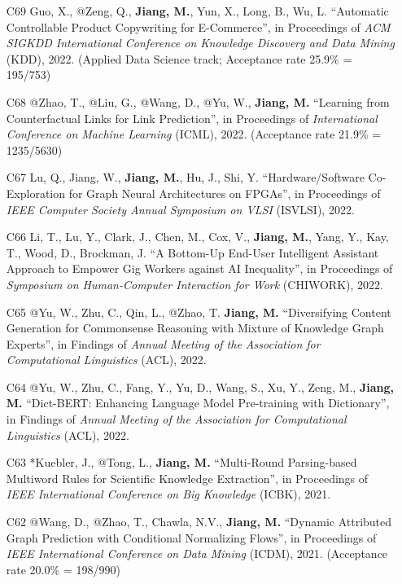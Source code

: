 \documentclass[10pt]{article}
\newenvironment{myindentpar}[1]%
{\begin{list}{}%
         {\setlength{\leftmargin}{#1}}%
         \item[]%
}
{\end{list}}
\newcounter{list}
\begin{document}
\begin{myindentpar}{0.00cm}
\begin{enumerate}[leftmargin=.5cm]
\item[C69] Guo, X., @Zeng, Q., \textbf{Jiang, M.}, Yun, X., Long, B., Wu, L. ``Automatic Controllable Product Copywriting for E-Commerce'', in Proceedings of \textit{ACM SIGKDD International Conference on Knowledge Discovery and Data Mining} (KDD), 2022. (Applied Data Science track; Acceptance rate 25.9\% = 195/753)

\item[C68] @Zhao, T., @Liu, G., @Wang, D., @Yu, W., \textbf{Jiang, M.} ``Learning from Counterfactual Links for Link Prediction'', in Proceedings of \textit{International Conference on Machine Learning} (ICML), 2022. (Acceptance rate 21.9\% = 1235/5630)

\item[C67] Lu, Q., Jiang, W., \textbf{Jiang, M.}, Hu, J., Shi, Y. ``Hardware/Software Co-Exploration for Graph Neural Architectures on FPGAs'', in Proceedings of \textit{IEEE Computer Society Annual Symposium on VLSI} (ISVLSI), 2022.

\item[C66] Li, T., Lu, Y., Clark, J., Chen, M., Cox, V., \textbf{Jiang, M.}, Yang, Y., Kay, T., Wood, D., Brockman, J. ``A Bottom-Up End-User Intelligent Assistant Approach to Empower Gig Workers against AI Inequality'', in Proceedings of \textit{Symposium on Human-Computer Interaction for Work} (CHIWORK), 2022.
		
\item[C65] @Yu, W., Zhu, C., Qin, L., @Zhao, T. \textbf{Jiang, M.} ``Diversifying Content Generation for Commonsense Reasoning with Mixture of Knowledge Graph Experts'', in Findings of \textit{Annual Meeting of the Association for Computational Linguistics} (ACL), 2022.

\item[C64] @Yu, W., Zhu, C., Fang, Y., Yu, D., Wang, S., Xu, Y., Zeng, M., \textbf{Jiang, M.} ``Dict-BERT: Enhancing Language Model Pre-training with Dictionary'', in Findings of \textit{Annual Meeting of the Association for Computational Linguistics} (ACL), 2022.

\item[C63] *Kuebler, J., @Tong, L., \textbf{Jiang, M.} ``Multi-Round Parsing-based Multiword Rules for Scientific Knowledge Extraction'', in Proceedings of \textit{IEEE International Conference on Big Knowledge} (ICBK), 2021.
		
\item[C62] @Wang, D., @Zhao, T., Chawla, N.V., \textbf{Jiang, M.} ``Dynamic Attributed Graph Prediction with Conditional Normalizing Flows'', in Proceedings of \textit{IEEE International Conference on Data Mining} (ICDM), 2021. (Acceptance rate 20.0\% = 198/990)


\end{enumerate}
\end{myindentpar}
\end{document}
